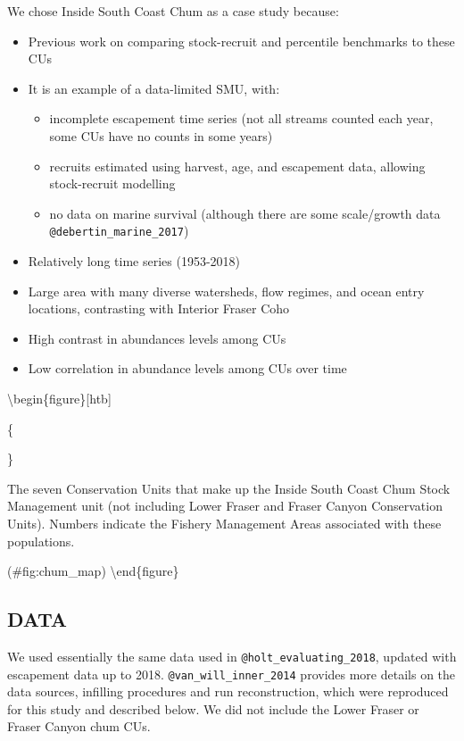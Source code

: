 \documentclass[11pt]{book}
\begin{document}
We chose Inside South Coast Chum as a case study because:
\begin{itemize}

\item
  Previous work on comparing stock-recruit and percentile benchmarks to these CUs
\item
  It is an example of a data-limited SMU, with:
  \begin{itemize}

  \item
    incomplete escapement time series (not all streams counted each year, some CUs have no counts in some years)
  \item
    recruits estimated using harvest, age, and escapement data, allowing stock-recruit modelling
  \item
    no data on marine survival (although there are some scale/growth data \texttt{@debertin\_marine\_2017})
  \end{itemize}
\item
  Relatively long time series (1953-2018)
\item
  Large area with many diverse watersheds, flow regimes, and ocean entry locations, contrasting with Interior Fraser Coho
\item
  High contrast in abundances levels among CUs
\item
  Low correlation in abundance levels among CUs over time
\end{itemize}
\textbackslash begin\{figure\}{[}htb{]}

\{\centering {}

\}

\caption{The seven Conservation Units that make up the Inside South Coast Chum Stock Management unit (not including Lower Fraser and Fraser Canyon Conservation Units). Numbers indicate the Fishery Management Areas associated with these populations.}

(\#fig:chum\_map) \textbackslash end\{figure\}

\hypertarget{data-2}{%
\subsection{DATA}\label{data-2}}

We used essentially the same data used in \texttt{@holt\_evaluating\_2018}, updated with escapement data up to 2018. \texttt{@van\_will\_inner\_2014} provides more details on the data sources, infilling procedures and run reconstruction, which were reproduced for this study and described below. We did not include the Lower Fraser or Fraser Canyon chum CUs.
\end{document}
